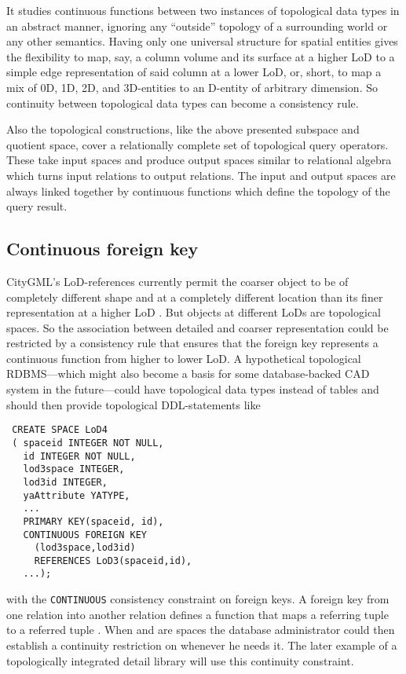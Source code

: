 \documentclass[5p]{elsarticle}
\newcommand{\qq}[1]{``#1''}
\begin{document}
It studies continuous functions between two instances of topological 
data types in an abstract manner, ignoring any \qq{outside} topology of a surrounding world or 
any other semantics. 
Having only one universal structure for spatial entities gives the flexibility to map, say, a 
column volume and its surface at a higher LoD to a simple edge representation of 
said column at a lower LoD, or, short, to map a mix of 0D, 1D, 2D, and 3D-entities to 
an D-entity of arbitrary dimension. So continuity between topological data types can become 
a consistency rule.   

Also the topological constructions, like the above presented subspace and 
quotient space, cover a relationally complete set of topological query operators. 
These take input spaces and produce output spaces similar to relational algebra 
which turns input relations to output relations. 
The input and output spaces are always linked together by continuous functions which 
define the topology of the query result.  


\subsection{Continuous foreign key}

CityGML's LoD-references currently permit the coarser 
object to be of completely different 
shape and at a completely different location than its finer representation 
at a higher LoD \cite[p.\ 314]{OosteromStoter:5D}. 
But objects at different LoDs are topological spaces. So the association between detailed 
and coarser representation could be restricted by a consistency rule that ensures that the 
foreign key represents a continuous function from higher to lower LoD. 
A hypothetical topological RDBMS---which might also become a basis for some database-backed CAD 
system in the future---could have topological data types  instead of tables  and 
should then provide topological DDL-statements like 
\begin{verbatim}
 CREATE SPACE LoD4
 ( spaceid INTEGER NOT NULL,
   id INTEGER NOT NULL,
   lod3space INTEGER,
   lod3id INTEGER,
   yaAttribute YATYPE, 
   ...
   PRIMARY KEY(spaceid, id),
   CONTINUOUS FOREIGN KEY
     (lod3space,lod3id) 
     REFERENCES LoD3(spaceid,id),
   ...);
\end{verbatim}
with the \texttt{CONTINUOUS} consistency constraint on foreign keys. 
A foreign key from one relation  into another relation  defines a function  
that maps a referring tuple  to a referred tuple . 
When  and  are spaces the database administrator could then establish a continuity 
restriction on  whenever he needs it. The later example of a topologically integrated 
detail library will use this continuity constraint. 
\end{document}
